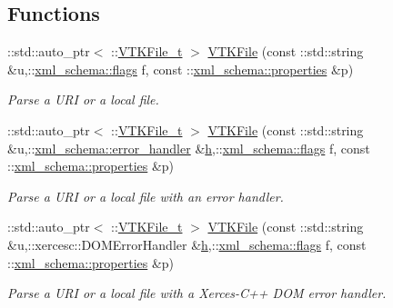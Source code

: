 \subsection*{Functions}
\begin{DoxyCompactItemize}
\item 
\-::std\-::auto\-\_\-ptr$<$ \-::\hyperlink{classVTKFile__t}{V\-T\-K\-File\-\_\-t} $>$ \hyperlink{vtk-unstructured_8cpp_a7c23f47cd1d791b22bff78904defd7eb}{V\-T\-K\-File} (const \-::std\-::string \&u,\-::\hyperlink{namespacexml__schema_a0612287d030cb2732d31a45b258fdc87}{xml\-\_\-schema\-::flags} f, const \-::\hyperlink{namespacexml__schema_a1a8ebac679580b41baebd62c7d641c1d}{xml\-\_\-schema\-::properties} \&p)
\begin{DoxyCompactList}\small\item\em Parse a U\-R\-I or a local file. \end{DoxyCompactList}\item 
\-::std\-::auto\-\_\-ptr$<$ \-::\hyperlink{classVTKFile__t}{V\-T\-K\-File\-\_\-t} $>$ \hyperlink{vtk-unstructured_8cpp_a88b6537c9daeb6b997120080b41f58e9}{V\-T\-K\-File} (const \-::std\-::string \&u,\-::\hyperlink{namespacexml__schema_a0a5d9528e9175cedf199984a8bb64d62}{xml\-\_\-schema\-::error\-\_\-handler} \&\hyperlink{MolSim_8cpp_aa6e8e201edf24007dc075bfef6e8210c}{h},\-::\hyperlink{namespacexml__schema_a0612287d030cb2732d31a45b258fdc87}{xml\-\_\-schema\-::flags} f, const \-::\hyperlink{namespacexml__schema_a1a8ebac679580b41baebd62c7d641c1d}{xml\-\_\-schema\-::properties} \&p)
\begin{DoxyCompactList}\small\item\em Parse a U\-R\-I or a local file with an error handler. \end{DoxyCompactList}\item 
\-::std\-::auto\-\_\-ptr$<$ \-::\hyperlink{classVTKFile__t}{V\-T\-K\-File\-\_\-t} $>$ \hyperlink{vtk-unstructured_8cpp_acec6a0976b0c88545964e132138b0380}{V\-T\-K\-File} (const \-::std\-::string \&u,\-::xercesc\-::\-D\-O\-M\-Error\-Handler \&\hyperlink{MolSim_8cpp_aa6e8e201edf24007dc075bfef6e8210c}{h},\-::\hyperlink{namespacexml__schema_a0612287d030cb2732d31a45b258fdc87}{xml\-\_\-schema\-::flags} f, const \-::\hyperlink{namespacexml__schema_a1a8ebac679580b41baebd62c7d641c1d}{xml\-\_\-schema\-::properties} \&p)
\begin{DoxyCompactList}\small\item\em Parse a U\-R\-I or a local file with a Xerces-\/\-C++ D\-O\-M error handler. \end{DoxyCompactList}\item 

\end{DoxyCompactItemize}
